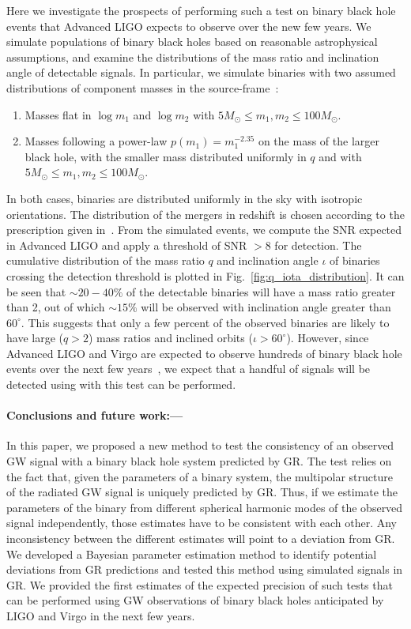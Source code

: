 \documentclass[prl,preprintnumbers,twocolumn,eqsecnum,floatfix,a4paper,nofootinbib,superscriptaddress]{revtex4}
\begin{document}
Here we investigate the  prospects of performing such a test on binary black hole events that  Advanced LIGO expects to observe over the new few years.  We simulate populations of binary black holes based on reasonable astrophysical assumptions, and examine the distributions of the mass ratio and inclination angle of detectable signals. In particular, we simulate binaries with two assumed distributions of component masses in the source-frame~\cite{rates_paper}:
\begin{enumerate}
\item Masses flat in $\log m_1$ and $\log m_2$   with $5 M_\odot \leq m_1, m_2  \leq 100 M_\odot$. 
\item Masses following a power-law $p(m_1) = m_1^{-2.35}$ on the mass of the larger black hole, with the smaller mass distributed uniformly in $q$ and with $5 M_\odot \leq m_1, m_2  \leq 100 M_\odot$. 
\end{enumerate}
In both cases, binaries are distributed uniformly in the sky with isotropic orientations. The distribution of the mergers in redshift is chosen according to the prescription given in~\cite{Dominik}. From the simulated events, we compute the SNR expected  in Advanced LIGO and apply a threshold of SNR $> 8$ for detection. The cumulative distribution of the mass ratio $q$ and inclination angle $\iota$ of binaries crossing the detection threshold is plotted in Fig.~\ref{fig:q_iota_distribution}. It can be seen that $\sim 20 - 40\%$ of the detectable binaries will have a mass ratio greater than 2, out of which  $\sim 15\%$ will  be observed with inclination angle greater than $60^\circ$. This suggests that only a few percent of the observed binaries are likely to have large ($q > 2$) mass ratios and inclined orbits ($\iota > 60^\circ$). However, since Advanced LIGO and Virgo are expected to observe hundreds of binary black hole events over the next few years~\cite{rates_paper}, we expect that a handful of signals will be detected using with this test can be performed. 


\paragraph{Conclusions and future work:---} In this paper, we proposed a new method to test the consistency of an observed GW signal with a binary black hole system predicted by GR. The test relies on the fact that, given the parameters of a binary system, the multipolar structure of the radiated GW signal is uniquely predicted by GR. Thus, if we estimate the parameters of the binary from different spherical harmonic modes of the observed signal independently, those estimates have to be consistent with each other. Any inconsistency between the different estimates will point to a deviation from GR. We developed a Bayesian parameter estimation method to identify potential deviations from GR predictions and tested this method using simulated signals in GR.  We provided the first estimates of the expected precision of such tests that can be performed using GW observations of binary black holes anticipated by LIGO and Virgo in the next few years. 
\end{document}
